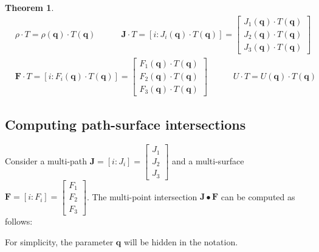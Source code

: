 \documentclass{book}
\newtheorem{thm}{Theorem}
\begin{document}
\begin{thm}
\begin{align*}
& \rho \cdot T = \rho(\mathbf{q}) \cdot T(\mathbf{q}) 
\quad\quad\quad \mathbf{J} \cdot T = [i : J_i(\mathbf{q}) \cdot T(\mathbf{q})] = \begin{bmatrix} J_1(\mathbf{q}) \cdot T(\mathbf{q}) \\ J_2(\mathbf{q}) \cdot T(\mathbf{q}) \\ J_3(\mathbf{q}) \cdot T(\mathbf{q}) \end{bmatrix} \\ 
& \mathbf{F} \cdot T = [i : F_i(\mathbf{q}) \cdot T(\mathbf{q})] = \begin{bmatrix} F_1(\mathbf{q}) \cdot T(\mathbf{q}) \\ F_2(\mathbf{q}) \cdot T(\mathbf{q}) \\ F_3(\mathbf{q}) \cdot T(\mathbf{q}) \end{bmatrix}  
\quad\quad\quad U \cdot T = U(\mathbf{q}) \cdot T(\mathbf{q})
\end{align*}
\end{thm}



\subsection*{Computing path-surface intersections}

Consider a multi-path \(\mathbf{J} = [i : J_i] = \begin{bmatrix} J_1 \\ J_2 \\ J_3 \end{bmatrix}\) and a multi-surface \(\mathbf{F} = [i : F_i] = \begin{bmatrix} F_1 \\ F_2 \\ F_3 \end{bmatrix}\). The multi-point intersection \(\mathbf{J} \bullet \mathbf{F}\) can be computed as follows:

For simplicity, the parameter \(\mathbf{q}\) will be hidden in the notation.

\vspace{1mm}
\end{document}
